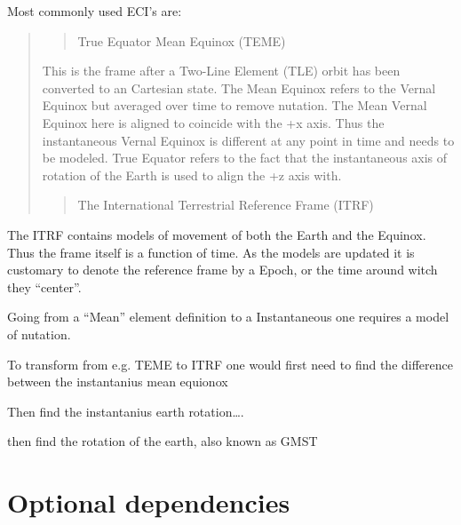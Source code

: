 \documentclass[letterpaper,10pt,english]{sphinxmanual}
\begin{document}
Most commonly used ECI’s are:
\begin{quote}
\begin{quote}\begin{description}
\item[{True Equator Mean Equinox (TEME)}] \leavevmode
\end{description}\end{quote}

This is the frame after a Two-Line Element (TLE) orbit has been converted to an Cartesian state. The Mean Equinox refers to the Vernal Equinox but averaged over time to remove nutation. The Mean Vernal Equinox here is aligned to coincide with the +x axis. Thus the instantaneous Vernal Equinox is different at any point in time and needs to be modeled. True Equator refers to the fact that the instantaneous axis of rotation of the Earth is used to align the +z axis with.
\begin{quote}\begin{description}
\item[{The International Terrestrial Reference Frame (ITRF)}] \leavevmode
\end{description}\end{quote}
\end{quote}

The ITRF contains models of movement of both the Earth and the Equinox. Thus the frame itself is a function of time. As the models are updated it is customary to denote the reference frame by a Epoch, or the time around witch they “center”.

Going from a “Mean” element definition to a Instantaneous one requires a model of nutation.

To transform from e.g. TEME to ITRF one would first need to find the difference between the instantanius mean equionox

Then find the instantanius earth rotation….

then find the rotation of the earth, also known as GMST


\chapter{Optional dependencies}
\label{\detokenize{introduction/more_dependencies:optional-dependencies}}\label{\detokenize{introduction/more_dependencies::doc}}
%
\begin{sphinxVerbatim}[commandchars=\\\{\}]
\end{sphinxVerbatim}
\end{document}
